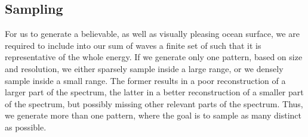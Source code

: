 \subsection{Sampling}
%
For us to generate a believable, as well as visually pleasing ocean surface, we
are required to include into our sum of waves a finite set of \wavenumbers such
that it is representative of the whole energy. If we generate only one pattern,
based on size and resolution, we either sparsely sample inside a large
\wavenumber range, or we densely sample inside a small \wavenumber range. The
former results in a poor reconstruction of a larger part of the spectrum, the
latter in a better reconstruction of a smaller part of the spectrum, but
possibly missing other relevant parts of the spectrum. Thus, we generate more
than one pattern, where the goal is to sample as many distinct
\wavenumbers as possible.

